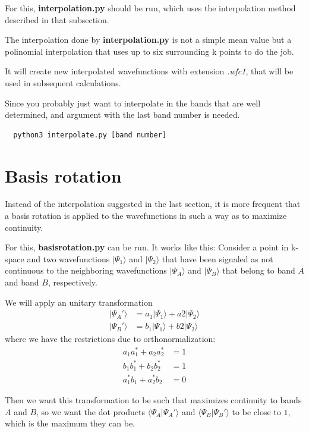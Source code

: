 \documentclass[a4paper,12pt]{report}
\begin{document}
 For this, \textbf{interpolation.py} should be run, which uses the interpolation method described in that subsection.

 The interpolation done by \textbf{interpolation.py} is not a simple mean value but a polinomial interpolation
 that uses up to six surrounding k points to do the job.

 It will create new interpolated wavefunctions with extension \emph{.wfc1}, that will be used in subsequent calculations.

 Since you probably just want to interpolate in the bands that are well determined, and argument with the last band number
 is needed.
 \begin{verbatim}
  python3 interpolate.py [band number]
 \end{verbatim}

\section{Basis rotation}
 Instead of the interpolation suggested in the last section, it is more frequent that a basis rotation
 is applied to the wavefunctions in such a way as to maximize continuity.

 For this, \textbf{basisrotation.py} can be run.
 It works like this:
 Consider a point in k-space and two wavefunctions $|\Psi_1\rangle$ and $|\Psi_2\rangle$
 that have been signaled as not continuous to the neighboring wavefunctions $|\Psi_A\rangle$ and $|\Psi_B\rangle$
 that belong to band $A$ and band $B$, respectively.

 We will apply an unitary transformation
 \begin{align*}
  |\Psi_A'\rangle &= a_1|\Psi_1\rangle + a2|\Psi_2\rangle \\
  |\Psi_B'\rangle &= b_1|\Psi_1\rangle + b2|\Psi_2\rangle
 \end{align*}
 where we have the restrictions due to orthonormalization:
 \begin{align*}
  a_1a_1^* + a_2a_2^* &= 1\\
  b_1b_1^* + b_2b_2^* &= 1\\
  a_1^*b_1 + a_2^*b_2 &= 0
 \end{align*}

 Then we want this transformation to be such that maximizes continuity to bands $A$ and $B$, so we want
 the dot products $\langle \Psi_A|\Psi_A'\rangle $ and $\langle \Psi_B|\Psi_B'\rangle $ to be close to $1$,
 which is the maximum they can be.
\end{document}
